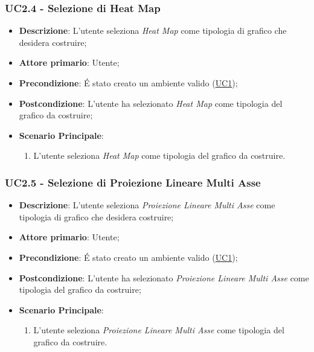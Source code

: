 \subsubsection{UC2.4 - Selezione di Heat Map}
\label{ssub:uc2.4}
\begin{itemize}

	\item \textbf{Descrizione}: L’utente seleziona \emph{Heat Map} come tipologia di grafico che desidera 
	costruire;

    \item \textbf{Attore primario}: Utente;

	\item \textbf{Precondizione}:   É stato creato un ambiente valido (\hyperref[sub:uc1]{UC1});

    \item \textbf{Postcondizione}:  L'utente ha selezionato \emph{Heat Map} come tipologia del grafico da 
	costruire;

	\item \textbf{Scenario Principale}: 
	\begin{enumerate}
		\item L'utente seleziona \emph{Heat Map} come tipologia del grafico da costruire.
	\end{enumerate}

\end{itemize}


\subsubsection{UC2.5 - Selezione di Proiezione Lineare Multi Asse}
\label{ssub:uc2.5}
\begin{itemize}

	\item \textbf{Descrizione}: L’utente seleziona \emph{Proiezione Lineare Multi Asse} come tipologia di grafico che 
	desidera costruire;

    \item \textbf{Attore primario}: Utente;

    \item \textbf{Precondizione}:   É stato creato un ambiente valido (\hyperref[sub:uc1]{UC1});

	\item \textbf{Postcondizione}:  L'utente ha selezionato \emph{Proiezione Lineare Multi Asse} come tipologia del 
	grafico da costruire;
	
	\item \textbf{Scenario Principale}: 
	\begin{enumerate}
		\item L'utente seleziona \emph{Proiezione Lineare Multi Asse} come tipologia del grafico da costruire.
	\end{enumerate}
\end{itemize}

